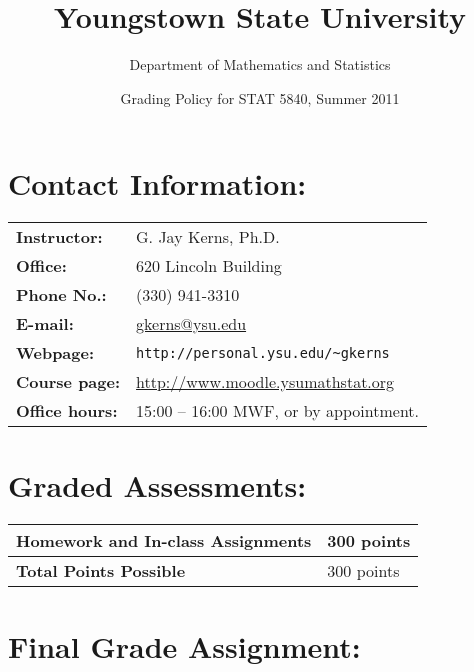 \documentclass[11pt]{article}
\title{\textbf{Youngstown State University}}
\author{Department of Mathematics and Statistics}
\date{Grading Policy for STAT 5840, Summer 2011}
\begin{document}
\maketitle


\section*{Contact Information:}
\label{sec-1}


\begin{center}
\begin{tabular}{l|l}
\hline
 \textbf{Instructor:}    &  G. Jay Kerns, Ph.D.                                                          \\
 \textbf{Office:}        &  620 Lincoln Building                                                         \\
 \textbf{Phone No.:}     &  (330) 941-3310                                                               \\
 \textbf{E-mail:}        &  \href{mailto:gkerns@ysu.edu}{gkerns@ysu.edu}                                 \\
 \textbf{Webpage:}       &  \texttt{http://personal.ysu.edu/\textasciitilde{}gkerns}                     \\
 \textbf{Course page:}   &  \href{http://www.moodle.ysumathstat.org}{http://www.moodle.ysumathstat.org}  \\
 \textbf{Office hours:}  &  15:00 – 16:00 MWF, or by appointment.                                        \\
\hline
\end{tabular}
\end{center}
\section*{Graded Assessments:}
\label{sec-2}


\begin{center}
\begin{tabular}{l|l}
\hline
 Homework and In-class Assignments  &  300 points  \\
\hline
 \textbf{Total Points Possible}     &  300 points  \\
\hline
\end{tabular}
\end{center}
\section*{Final Grade Assignment:}
\label{sec-3}
\end{document}
